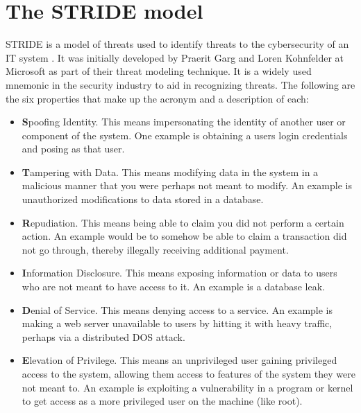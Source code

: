 \section{The STRIDE model} \label{ch:method:stride}
STRIDE is a model of threats used to identify threats to the cybersecurity of an IT system \cite{stride}. It was initially developed by Praerit Garg and Loren Kohnfelder at Microsoft as part of their threat modeling technique. It is a widely used mnemonic in the security industry to aid in recognizing threats. The following are the six properties that make up the acronym and a description of each:
\begin{itemize}
    \item \textbf{S}poofing Identity. This means impersonating the identity of another user or component of the system. One example is obtaining a users login credentials and posing as that user.
    \item \textbf{T}ampering with Data. This means modifying data in the system in a malicious manner that you were perhaps not meant to modify. An example is unauthorized modifications to data stored in a database.
    \item \textbf{R}epudiation. This means being able to claim you did not perform a certain action. An example would be to somehow be able to claim a transaction did not go through, thereby illegally receiving additional payment.
    \item \textbf{I}nformation Disclosure. This means exposing information or data to users who are not meant to have access to it. An example is a database leak.
    \item \textbf{D}enial of Service. This means denying access to a service. An example is making a web server unavailable to users by hitting it with heavy traffic, perhaps via a distributed \gls{DOS} attack.
    \item \textbf{E}levation of Privilege. This means an unprivileged user gaining privileged access to the system, allowing them access to features of the system they were not meant to. An example is exploiting a vulnerability in a program or kernel to get access as a more privileged user on the machine (like root).
\end{itemize}
